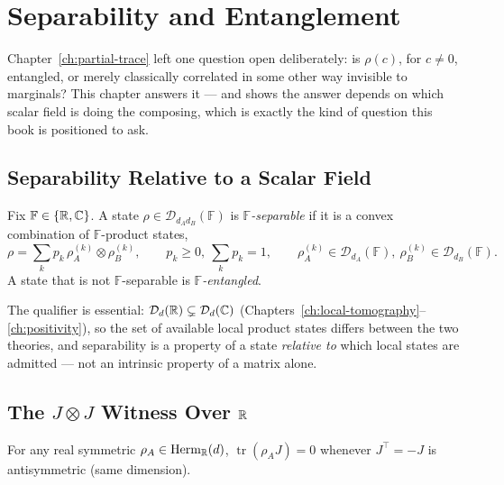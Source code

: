 \chapter{Separability and Entanglement}
\label{ch:entanglement}

Chapter~\ref{ch:partial-trace} left one question open deliberately: is
$\rho(c)$, for $c\ne0$, entangled, or merely classically correlated in some
other way invisible to marginals? This chapter answers it — and shows the
answer depends on which scalar field is doing the composing, which is exactly
the kind of question this book is positioned to ask.

\section{Separability Relative to a Scalar Field}

\begin{definition}[Separability]
\label{def:separability}
Fix $\mathbb F \in \{\mathbb{R},\mathbb{C}\}$. A state $\rho \in \mathcal D_{d_Ad_B}(\mathbb
F)$ is \emph{$\mathbb F$-separable} if it is a convex combination of
$\mathbb F$-product states,
\begin{equation}
\rho = \sum_k p_k\, \rho_A^{(k)} \otimes \rho_B^{(k)}, \qquad p_k \ge 0,\
\sum_k p_k = 1,\qquad \rho_A^{(k)} \in \mathcal D_{d_A}(\mathbb F),\ \rho_B^{(k)}
\in \mathcal D_{d_B}(\mathbb F).
\end{equation}
A state that is not $\mathbb F$-separable is \emph{$\mathbb F$-entangled}.
\end{definition}

The qualifier is essential: $\mathcal D_d(\mathbb{R}) \subsetneq \mathcal D_d(\mathbb{C})$
(Chapters~\ref{ch:local-tomography}--\ref{ch:positivity}), so the set of
available local product states differs between the two theories, and
separability is a property of a state \emph{relative to} which local states
are admitted — not an intrinsic property of a matrix alone.

\section{The \texorpdfstring{$J\otimes J$}{J⊗J} Witness Over \texorpdfstring{$\mathbb{R}$}{R}}

\begin{lemma}
\label{lem:trace-symmetric-antisymmetric}
For any real symmetric $\rho_A \in \mathrm{Herm}_{\mathbb{R}}(d)$, $\operatorname{tr}(\rho_A
J) = 0$ whenever $J^\top = -J$ is antisymmetric (same dimension).
\end{lemma}

